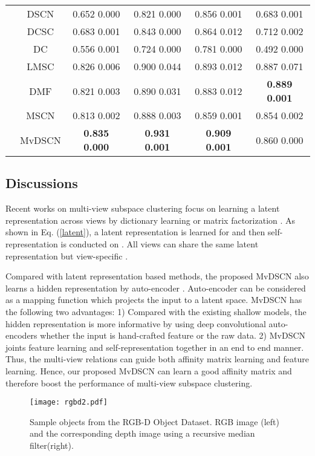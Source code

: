 \documentclass[journal]{IEEEtran}
\begin{document}
\begin{table*}
\begin{tabular}{|c|c|c|c|c|c|}
		& DSCN  & 0.652  0.000 & 0.821  0.000 &  0.856  0.001 & 0.683  0.001 \\
		& DCSC & 0.683  0.001 & 0.843  0.000 & 0.864  0.012 & 0.712  0.002 \\
		& DC	& 0.556  0.001 & 0.724  0.000 & 0.781  0.000 & 0.492  0.000 \\
		& LMSC & 0.826  0.006 & 0.900  0.044 & 0.893  0.012 & 0.887  0.071 \\
		& DMF & 0.821  0.003 & 0.890  0.031 & 0.883  0.012 & \textbf{0.889  0.001} \\
		& MSCN  & 0.813  0.002 & 0.888  0.003 & 0.859  0.001 & 0.854  0.002 \\
		& MvDSCN & \textbf{0.835  0.000} & \textbf{0.931  0.001} & \textbf{0.909  0.001} & 0.860  0.000 \\
		\hline
	\end{tabular}
	\label{table:multiview}
\end{table*}



\subsection{Discussions}
Recent works on multi-view subspace clustering focus on learning a latent representation across views by dictionary learning or matrix factorization \cite{Zhang2017LatentMS,ZhangGeneralized,Zhao2017MultiViewCV}.
As shown in Eq. (\ref{latent}), a latent representation  is learned for  and then self-representation is conducted on .
All views can share the same latent representation \cite{Zhang2017LatentMS,ZhangGeneralized} but view-specific .

Compared with latent representation based methods, the proposed MvDSCN also learns a hidden representation  by auto-encoder .
Auto-encoder can be considered as a mapping function which projects the input to a latent space.
MvDSCN has the following two advantages:
1) Compared with the existing shallow models, the hidden representation  is more informative by using deep convolutional auto-encoders
whether the input  is hand-crafted feature or the raw data.
2) MvDSCN joints feature learning and self-representation together in an end to end manner. Thus, the multi-view relations can guide both affinity matrix learning and feature learning.
Hence, our proposed MvDSCN can learn a good affinity matrix and therefore boost the performance of multi-view subspace clustering.




\begin{figure}
	\centering
	\texttt{[image: rgbd2.pdf]}
	\caption{Sample objects from the RGB-D Object Dataset. RGB image (left) and the corresponding depth image using a recursive median filter(right).}
	\label{fig:rgbdexample}
\end{figure}
\end{document}
